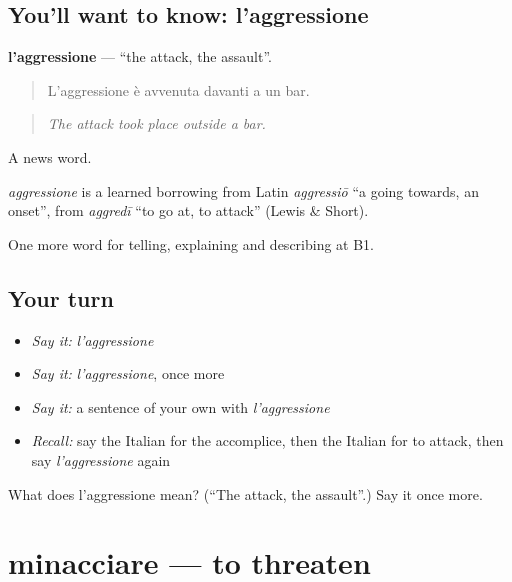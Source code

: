 \subsection*{You'll want to know: l'aggressione}
\textbf{l'aggressione} — \textquotedblleft{}the attack, the assault\textquotedblright{}.

\begin{quote}
L'aggressione è avvenuta davanti a un bar.
\end{quote}

\begin{quote}
\emph{The attack took place outside a bar.}
\end{quote}

A news word.

\begin{cousinweb}
\emph{aggressione} is a learned borrowing from Latin \emph{aggressiō} \textquotedblleft{}a going towards, an onset\textquotedblright{}, from \emph{aggredī} \textquotedblleft{}to go at, to attack\textquotedblright{} (Lewis \& Short).
\end{cousinweb}

\begin{grammarlens}[title={What you've built}]
One more word for telling, explaining and describing at B1.
\end{grammarlens}

\subsection*{Your turn}
\begin{itemize}
\raggedright
  \item \emph{Say it:} \emph{l'aggressione}
  \item \emph{Say it:} \emph{l'aggressione}, once more
  \item \emph{Say it:} a sentence of your own with \emph{l'aggressione}
  \item \emph{Recall:} say the Italian for the accomplice, then the Italian for to attack, then say \emph{l'aggressione} again
\end{itemize}

\begin{tcolorbox}[breakable,colback=teal!4,colframe=teal!35!black,title={Before you move on}]
What does l'aggressione mean? (\textquotedblleft{}The attack, the assault\textquotedblright{}.) Say it once more.
\end{tcolorbox}
\section[minacciare]{minacciare — to threaten}

